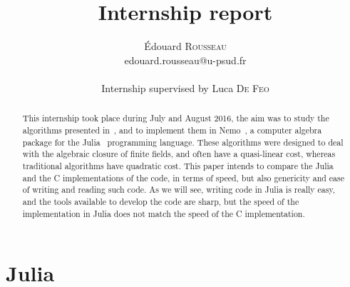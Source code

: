 \documentclass[a4paper,11pt]{article}
\title{Internship report}
\author{Édouard \textsc{Rousseau}\\edouard.rousseau@u-psud.fr\\ \\Internship 
supervised by Luca \textsc{De 
Feo}}
\theoremstyle{break}
\theoremstyle{definition}
\theoremstyle{remark}
\begin{document}
\maketitle

\begin{abstract}

  This internship took place during July and August 2016, the aim was to study
  the algorithms presented in~\cite{DeDoSc14}, and to implement them in
  Nemo~\cite{Nemo}, a computer algebra package for the Julia~\cite{Julia} programming
  language. These algorithms were designed to deal with the algebraic closure 
  of finite fields, and often have a quasi-linear cost, whereas traditional 
  algorithms have quadratic cost. This paper intends to compare the Julia 
  and the C implementations of the code, in terms of speed, but also genericity 
  and ease of writing and reading such code. As we will see, writing code in 
  Julia is really easy, and the tools available to develop the code are 
  sharp, but the speed of the implementation in Julia does not match the speed 
  of the C implementation.

\end{abstract}

\tableofcontents

\clearpage

\section{Julia}
\end{document}
